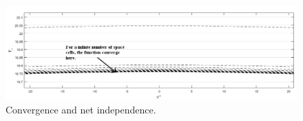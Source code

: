 \documentclass[xcolor=dvipsnames,8pt,aspectratio=34]{beamer}
\begin{document}
	
	
	
	
			\begin{frame}
		\begin{figure}
			\centering
			\includegraphics[angle=0, scale=0.32]{convergnciaprimeira}
			\caption{Convergence and net independence.}
			\label{convergencia}
		\end{figure}
	\end{frame}
		
	
	
	
		
\end{document}
